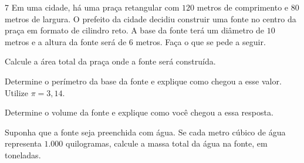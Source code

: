 \num{7} Em uma cidade, há uma praça retangular com $120$ metros de comprimento e
$80$ metros de largura. O prefeito da cidade decidiu construir uma fonte no centro
da praça em formato de cilindro reto. A base da fonte terá um diâmetro de $10$ metros
e a altura da fonte será de $6$ metros. Faça o que se pede a seguir.

\begin{escolha}
\item Calcule a área total da praça onde a fonte será construída.




\item Determine o perímetro da base da fonte e explique como chegou a esse valor.
Utilize $\pi = 3,14$.






\item Determine o volume da fonte e explique como você chegou a essa resposta.





\item Suponha que a fonte seja preenchida com água. Se cada metro cúbico de água
representa $1.000$ quilogramas, calcule a massa total da água na fonte, em toneladas.






\end{escolha}

